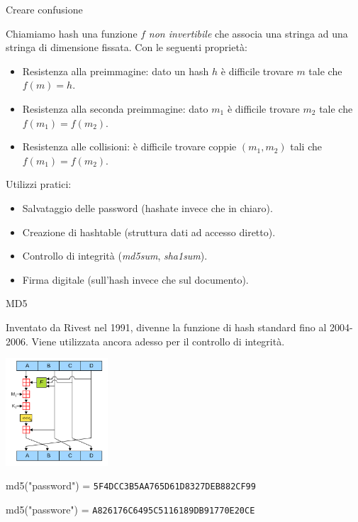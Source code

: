 \documentclass[handout, xcolor=dvipsnames,aspectratio=169]{beamer}
\begin{document}
\begin{frame}{Creare confusione}

\pause

Chiamiamo hash una funzione $f$ \textit{non invertibile} che associa una stringa ad una stringa di dimensione fissata. Con le seguenti proprietà:

\pause

\begin{itemize}
  \item Resistenza alla preimmagine: dato un hash $h$ è difficile trovare $m$ tale che $f(m) = h$.
  \item Resistenza alla seconda preimmagine: dato $m_1$ è difficile trovare $m_2$ tale che $f(m_1) = f(m_2)$.
  \item Resistenza alle collisioni: è difficile trovare coppie $(m_1, m_2)$ tali che $f(m_1) = f(m_2)$.
\end{itemize}

\pause

Utilizzi pratici:

\begin{itemize}
  \item Salvataggio delle password (hashate invece che in chiaro).
  \item Creazione di hashtable (struttura dati ad accesso diretto).
  \item Controllo di integrità (\textit{md5sum}, \textit{sha1sum}).
  \item Firma digitale (sull'hash invece che sul documento).
\end{itemize}

\end{frame}

\begin{frame}{MD5}
  
    \pause
  Inventato da Rivest nel 1991, divenne la funzione di hash standard fino al 2004-2006.
  Viene utilizzata ancora adesso per il controllo di integrità.
    
    \pause
  \medskip
  
  \centering
  {
  \includegraphics[width=3.8cm]{img/md5}
  }
  
    \pause
  md5("password") = \texttt{5F4DCC3B5AA765D61D8327DEB882CF99}
  
    \pause
  md5("passwore") = \texttt{A826176C6495C5116189DB91770E20CE}
  
\end{frame}
\end{document}
